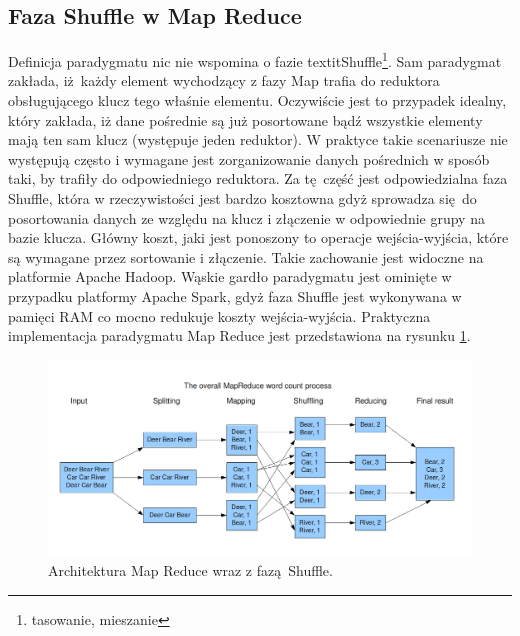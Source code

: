 \subsection{Faza Shuffle w Map Reduce}
Definicja paradygmatu nic nie wspomina o fazie textit{Shuffle}\footnote{tasowanie, mieszanie}. Sam paradygmat zakłada, iż każdy element wychodzący z fazy Map trafia do reduktora obsługującego klucz tego właśnie elementu. Oczywiście jest to przypadek idealny, który zakłada, iż dane pośrednie są już posortowane bądź wszystkie elementy mają ten sam klucz (występuje jeden reduktor). W praktyce takie scenariusze nie występują często i wymagane jest zorganizowanie danych pośrednich w sposób taki, by trafiły do odpowiedniego reduktora. Za tę część jest odpowiedzialna faza Shuffle, która w rzeczywistości jest bardzo kosztowna gdyż sprowadza się do posortowania danych ze względu na klucz i złączenie w odpowiednie grupy na bazie klucza. Główny koszt, jaki jest ponoszony to operacje wejścia-wyjścia, które są wymagane przez sortowanie i złączenie. Takie zachowanie jest widoczne na platformie Apache Hadoop\cite{shuffle_description}. Wąskie gardło paradygmatu jest ominięte w przypadku platformy Apache Spark, gdyż faza Shuffle jest wykonywana w pamięci RAM co mocno redukuje koszty wejścia-wyjścia\cite{spark_in_memory}.
\newline
Praktyczna implementacja paradygmatu Map Reduce jest przedstawiona na rysunku \ref{fig:@=map_shuffle_reduce_schema}.
\begin{figure}
	\centering
	\includegraphics[scale=0.3]{MapReduceWordCount.png}
	\caption{Architektura Map Reduce wraz z fazą Shuffle\cite{map_shuffle_reduce_figure}.}
	\label{fig:@=map_shuffle_reduce_schema}
\end{figure}
